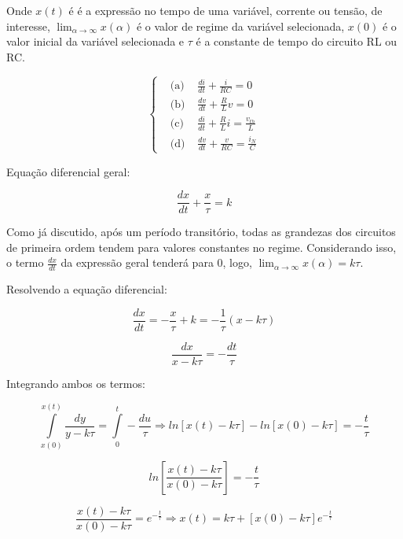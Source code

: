 \documentclass[12pt,fleqn]{book} %
\begin{document}
{Onde $x(t)$ é é a expressão no tempo de uma variável, corrente ou tensão, de interesse, $ \lim_{\alpha\rightarrow\infty}x(\alpha) $ é o valor de regime da variável selecionada, $x(0)$ é o valor inicial da variável selecionada e $\tau$ é a constante de tempo do circuito RL ou RC.

\begin{equation}
\left\{\begin{aligned} & 
        \text{(a)} &\frac{di}{dt}+\frac{i}{RC}=0\\& 
        \text{(b)} &\frac{dv}{dt}+\frac{R}{L}v=0\\&
        \text{(c)  } &\frac{di}{dt}+\frac{R}{L}i=\frac{v_{th}}{L}\\&
        \text{(d)  } &\frac{dv}{dt}+\frac{v}{RC}=\frac{i_N}{C}
    \end{aligned}\right.
\end{equation}

Equação diferencial geral:

\begin{equation}
\frac{dx}{dt} + \frac{x}{\tau} = k
\end{equation}

Como já discutido, após um período transitório, todas as grandezas dos circuitos de primeira ordem tendem para valores constantes no regime. Considerando isso, o termo $\frac{dx}{dt}$ da expressão geral tenderá para 0, logo, $\lim_{\alpha\rightarrow\infty}x(\alpha)=k\tau$.

Resolvendo a equação diferencial:

\begin{equation}
\frac{dx}{dt} = -\frac{x}{\tau} + k = -\frac{1}{\tau}(x-k\tau)
\end{equation}

\begin{equation}
\frac{dx}{x-k\tau} = -\frac{dt}{\tau}
\end{equation}

Integrando ambos os termos:

\begin{equation}
\int\limits_{x(0)}^{x(t)}\frac{dy}{y-k\tau} = \int\limits_{0}^{t}-\frac{du}{\tau}\Rightarrow ln[x(t)-k\tau]-ln[x(0)-k\tau] = -\frac{t}{\tau}
\end{equation}

\begin{equation}
ln[\frac{x(t)-k\tau}{x(0)-k\tau}] = -\frac{t}{\tau}
\end{equation}

\begin{equation}
\frac{x(t)-k\tau}{x(0)-k\tau} = e^{-\frac{t}{\tau}}\Rightarrow x(t) = k\tau + [x(0)-k\tau]e^{-\frac{t}{\tau}}
\end{equation}


}
\end{document}
